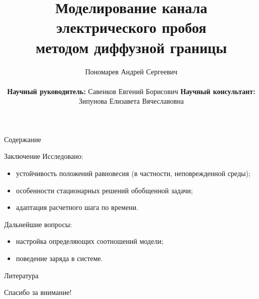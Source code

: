 \documentclass[aspectratio=169]{beamer}
\title[Электрический пробой]{Моделирование канала электрического пробоя \\ методом диффузной границы}
\author[Пономарев А. С.]{
	Пономарев Андрей Сергеевич \\[4mm]
	\raggedright
	\hspace*{8cm}
	\textbf{Научный руководитель:} \linebreak
	\hspace*{8cm}
	\vspace{2mm}
	Савенков Евгений Борисович
	\hspace*{8cm}
	\textbf{Научный консультант:} \linebreak
	\hspace*{8cm}
	Зипунова Елизавета Вячеславовна
}
\institute[ИПМ, МФТИ]{}
\date[Новые горизонты]{
	\vspace*{-8mm} \hfill \break
	Конкурс работ молодых ученых \\[4mm]
	{
	\small
	Новые горизонты прикладной математики \\
	13--16 мая 2026 г. \par
	}
}
\newcommand{\parind}{\hspace{7.5mm}}
\newcommand{\nologo}{\setbeamertemplate{logo}{}}
\begin{document}

\begin{frame}
\titlepage
\end{frame}

\begin{frame}{Содержание}
\Large
\tableofcontents
\end{frame}











\begin{frame}{Заключение}
\large
\parind Исследовано:
\begin{itemize}
	\item устойчивость положений равновесия (в частности, неповрежденной среды);
	\item особенности стационарных решений обобщенной задачи;
	\item адаптация расчетного шага по времени.
\end{itemize}
\vspace{4mm}
\parind Дальнейшие вопросы:
\begin{itemize}
	\item настройка определяющих соотношений модели;
	\item поведение заряда в системе.
\end{itemize}
\end{frame}

{
\nologo
\begin{frame}{Литература}
\vspace{-2mm}
\printbibliography
\end{frame}
}

\begin{frame}{}
\begin{center}
	\Large
	Спасибо за внимание!
\end{center}
\end{frame}
\end{document}
